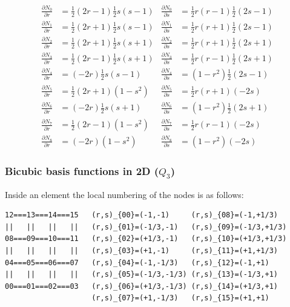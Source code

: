 \begin{mdframed}[backgroundcolor=blue!5]
\begin{align}
\frac{\partial N_0}{\partial r}&= \frac{1}{2}(2r-1)  \frac{1}{2}s(s-1) & 
\frac{\partial N_0}{\partial s}&= \frac{1}{2}r(r-1)  \frac{1}{2}(2s-1)\nonumber\\
\frac{\partial N_1}{\partial r}&= \frac{1}{2}(2r+1)  \frac{1}{2}s(s-1) &
\frac{\partial N_1}{\partial s}&= \frac{1}{2}r(r+1)  \frac{1}{2}(2s-1)\nonumber\\
\frac{\partial N_2}{\partial r}&= \frac{1}{2}(2r+1)  \frac{1}{2}s(s+1) &
\frac{\partial N_2}{\partial s}&= \frac{1}{2}r(r+1)  \frac{1}{2}(2s+1)\nonumber\\
\frac{\partial N_3}{\partial r}&= \frac{1}{2}(2r-1)  \frac{1}{2}s(s+1) &
\frac{\partial N_3}{\partial s}&= \frac{1}{2}r(r-1)  \frac{1}{2}(2s+1)\nonumber\\
\frac{\partial N_4}{\partial r}&=       (-2r)  \frac{1}{2}s(s-1) &
\frac{\partial N_4}{\partial s}&=     (1-r^2)  \frac{1}{2}(2s-1)\nonumber\\
\frac{\partial N_5}{\partial r}&= \frac{1}{2}(2r+1)     (1-s^2)&
\frac{\partial N_5}{\partial s}&= \frac{1}{2}r(r+1)        (-2s)\nonumber\\
\frac{\partial N_6}{\partial r}&=       (-2r)  \frac{1}{2}s(s+1)&
\frac{\partial N_6}{\partial s}&=     (1-r^2)  \frac{1}{2}(2s+1)\nonumber\\
\frac{\partial N_7}{\partial r}&= \frac{1}{2}(2r-1)     (1-s^2)&
\frac{\partial N_7}{\partial s}&= \frac{1}{2}r(r-1)        (-2s)\nonumber\\
\frac{\partial N_8}{\partial r}&=       (-2r)     (1-s^2)&
\frac{\partial N_8}{\partial s}&=     (1-r^2)        (-2s)\nonumber
\end{align}
\end{mdframed}




\subsubsection{Bicubic basis functions in 2D ($Q_3$)}

Inside an element the local numbering of the nodes is as follows:
\begin{verbatim}
12===13===14===15   (r,s)_{00}=(-1,-1)     (r,s)_{08}=(-1,+1/3)  
||   ||   ||   ||   (r,s)_{01}=(-1/3,-1)   (r,s)_{09}=(-1/3,+1/3)
08===09===10===11   (r,s)_{02}=(+1/3,-1)   (r,s)_{10}=(+1/3,+1/3)
||   ||   ||   ||   (r,s)_{03}=(+1,-1)     (r,s)_{11}=(+1,+1/3)
04===05===06===07   (r,s)_{04}=(-1,-1/3)   (r,s)_{12}=(-1,+1)
||   ||   ||   ||   (r,s)_{05}=(-1/3,-1/3) (r,s)_{13}=(-1/3,+1)
00===01===02===03   (r,s)_{06}=(+1/3,-1/3) (r,s)_{14}=(+1/3,+1)
                    (r,s)_{07}=(+1,-1/3)   (r,s)_{15}=(+1,+1)
\end{verbatim}

